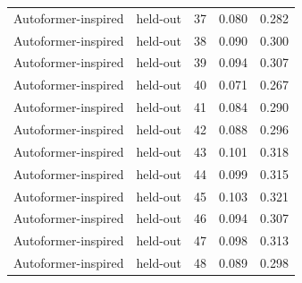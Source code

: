 \begin{tabular}{llrrr}
Autoformer-inspired & held-out & 37 & 0.080 & 0.282 \\
Autoformer-inspired & held-out & 38 & 0.090 & 0.300 \\
Autoformer-inspired & held-out & 39 & 0.094 & 0.307 \\
Autoformer-inspired & held-out & 40 & 0.071 & 0.267 \\
Autoformer-inspired & held-out & 41 & 0.084 & 0.290 \\
Autoformer-inspired & held-out & 42 & 0.088 & 0.296 \\
Autoformer-inspired & held-out & 43 & 0.101 & 0.318 \\
Autoformer-inspired & held-out & 44 & 0.099 & 0.315 \\
Autoformer-inspired & held-out & 45 & 0.103 & 0.321 \\
Autoformer-inspired & held-out & 46 & 0.094 & 0.307 \\
Autoformer-inspired & held-out & 47 & 0.098 & 0.313 \\
Autoformer-inspired & held-out & 48 & 0.089 & 0.298 \\
\bottomrule
\end{tabular}
